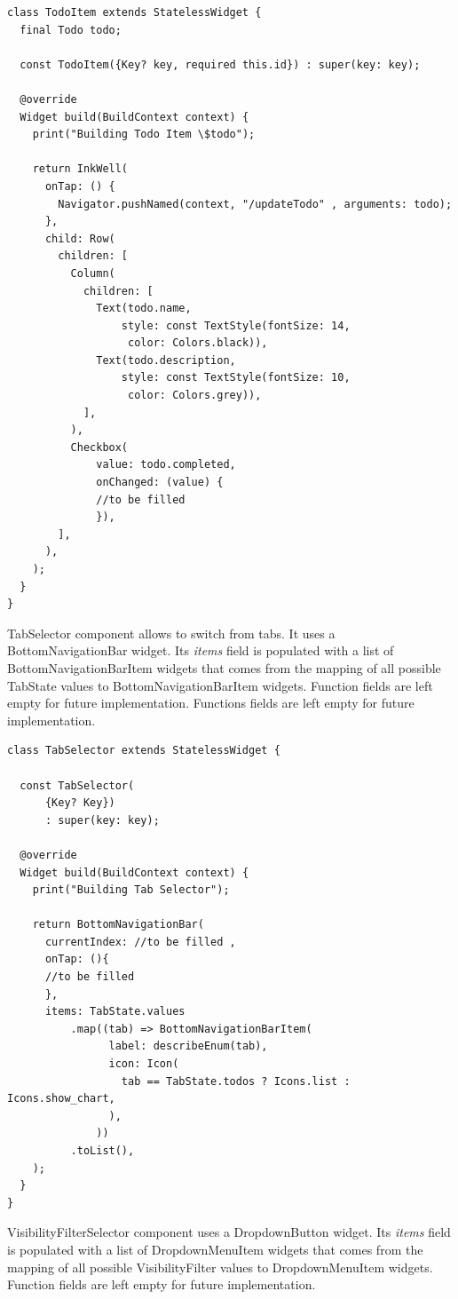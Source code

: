 	\mbox{}
	\begin{code}
	 \mbox{}
			\label{code:2.8}
	\begin{verbatim}
class TodoItem extends StatelessWidget {
  final Todo todo;

  const TodoItem({Key? key, required this.id}) : super(key: key);

  @override
  Widget build(BuildContext context) {
    print("Building Todo Item \$todo");

    return InkWell(
      onTap: () {
        Navigator.pushNamed(context, "/updateTodo" , arguments: todo);
      },
      child: Row(
        children: [
          Column(
            children: [
              Text(todo.name,
                  style: const TextStyle(fontSize: 14,
                   color: Colors.black)),
              Text(todo.description,
                  style: const TextStyle(fontSize: 10,
                   color: Colors.grey)),
            ],
          ),
          Checkbox(
              value: todo.completed,
              onChanged: (value) {
              //to be filled
              }),
        ],
      ),
    );
  }
}

	\end{verbatim}
	\end{code}	
TabSelector component allows to switch from tabs. It uses a BottomNavigationBar widget. Its \textit{items} field is populated with a list of BottomNavigationBarItem widgets that comes from the mapping of all possible TabState values to BottomNavigationBarItem widgets. Function fields are left empty for future implementation.
	 Functions fields are left empty for future implementation.
	
	\mbox{}
	\begin{code}
	 \mbox{}
			\label{code:2.9}
	\begin{verbatim}
class TabSelector extends StatelessWidget {

  const TabSelector(
      {Key? Key})
      : super(key: key);

  @override
  Widget build(BuildContext context) {
    print("Building Tab Selector");

    return BottomNavigationBar(
      currentIndex: //to be filled ,
      onTap: (){
      //to be filled
      },
      items: TabState.values
          .map((tab) => BottomNavigationBarItem(
                label: describeEnum(tab),
                icon: Icon(
                  tab == TabState.todos ? Icons.list : Icons.show_chart,
                ),
              ))
          .toList(),
    );
  }
}

	\end{verbatim}
	\end{code}
VisibilityFilterSelector component uses a DropdownButton widget. Its \textit{items} field is populated with a list of DropdownMenuItem widgets that comes from the mapping of all possible VisibilityFilter values to DropdownMenuItem widgets. Function fields are left empty for future implementation.
	
